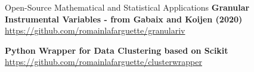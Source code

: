 \documentclass[usegeometry, 10pt, a4paper]{cv} %
\newcommand{\activite}[1]{\textbf{#1}\ }
\begin{document}
\begin{rubriquetableau}[0.95\textwidth]{Open-Source Mathematical and Statistical Applications}
\small
\activite{Granular Instrumental Variables - from Gabaix and Koijen (2020)} \\
\hspace{0.6cm} \small{\url{https://github.com/romainlafarguette/granulariv}}
\vspace{0.4cm} 

\small
\activite{Python Wrapper for Data Clustering based on Scikit} \\
\hspace{0.6cm} \small{\url{https://github.com/romainlafarguette/clusterwrapper}}
\vspace{0.4cm} 

\end{rubriquetableau}


\end{document}
